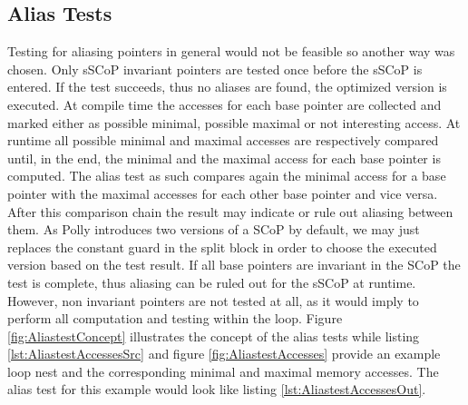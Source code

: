 \subsection{Alias Tests}
Testing for aliasing pointers in general would not be feasible so another way 
was chosen. Only sSCoP invariant pointers are tested once before the sSCoP is
entered. If the test succeeds, thus no aliases are found, the optimized version
is executed. At compile time the accesses for each base pointer are collected and
marked either as possible minimal, possible maximal or not interesting access. At 
runtime all possible minimal and maximal accesses are respectively compared until,
in the end, the minimal and the maximal access for each base pointer is computed.
The alias test as such compares again the minimal access for a base pointer with the maximal 
accesses for each other base pointer and vice versa. After this comparison chain the 
result may indicate or rule out aliasing between them. As Polly introduces two 
versions of a SCoP by default, we may just replaces the constant guard in the
split block in order to choose the executed version based on the test result.
If all base pointers are invariant in the SCoP the test is complete,
thus aliasing can be ruled out for the sSCoP at runtime.
However, non invariant pointers are not tested at all, as it would 
imply to perform all computation and testing within the loop. 
Figure \ref{fig:AliastestConcept} illustrates the concept of the alias
tests while listing \ref{lst:AliastestAccessesSrc} and figure
\ref{fig:AliastestAccesses} provide an example loop nest and the corresponding 
minimal and maximal memory accesses. 
The alias test for this example would look like listing
\ref{lst:AliastestAccessesOut}.

